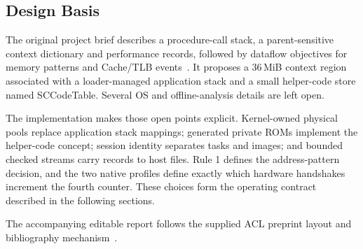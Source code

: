\subsection{Design Basis}
The original project brief describes a procedure-call stack, a parent-sensitive context dictionary and performance records, followed by dataflow objectives for memory patterns and Cache/TLB events~\citep{designbrief}. It proposes a 36\,MiB context region associated with a loader-managed application stack and a small helper-code store named SCCodeTable. Several OS and offline-analysis details are left open.

The implementation makes those open points explicit. Kernel-owned physical pools replace application stack mappings; generated private ROMs implement the helper-code concept; session identity separates tasks and images; and bounded checked streams carry records to host files. Rule 1 defines the address-pattern decision, and the two native profiles define exactly which hardware handshakes increment the fourth counter. These choices form the operating contract described in the following sections.

The accompanying editable report follows the supplied ACL preprint layout and bibliography mechanism~\citep{acltemplate}.
